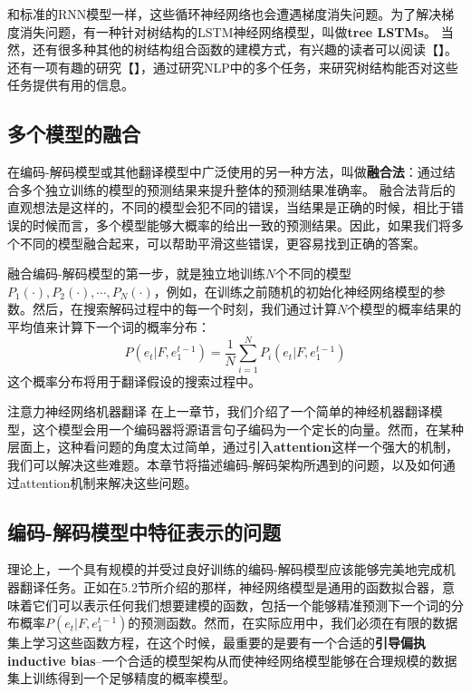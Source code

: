 \documentclass[10pt,a4paper]{ctexart}
\makeatletter
\renewcommand{\section}{\@startsection{section}{1}{0mm}
  {-\baselineskip}{0.5\baselineskip}{\bf\leftline}}
\makeatother
\begin{document}
和标准的RNN模型一样，这些循环神经网络也会遭遇梯度消失问题。为了解决梯度消失问题，有一种针对树结构的LSTM神经网络模型，叫做\textbf{tree LSTMs}。
当然，还有很多种其他的树结构组合函数的建模方式，有兴趣的读者可以阅读【】。
还有一项有趣的研究【】，通过研究NLP中的多个任务，来研究树结构能否对这些任务提供有用的信息。

\subsection{多个模型的融合}
在编码-解码模型或其他翻译模型中广泛使用的另一种方法，叫做\textbf{融合法}：通过结合多个独立训练的模型的预测结果来提升整体的预测结果准确率。
融合法背后的直观想法是这样的，不同的模型会犯不同的错误，当结果是正确的时候，相比于错误的时候而言，多个模型能够大概率的给出一致的预测结果。因此，如果我们将多个不同的模型融合起来，可以帮助平滑这些错误，更容易找到正确的答案。

融合编码-解码模型的第一步，就是独立地训练$N$个不同的模型$P_1(\cdot),P_2(\cdot),\cdots,P_N(\cdot)$，例如，在训练之前随机的初始化神经网络模型的参数。然后，在搜索解码过程中的每一个时刻，我们通过计算$N$个模型的概率结果的平均值来计算下一个词的概率分布：
\[
 P(e_t | F,e_1^{t-1}) = \frac{1}{N} \sum_{i=1}^{N} P_i(e_t | F,e_1^{t-1})
\]
这个概率分布将用于翻译假设的搜索过程中。


\section{注意力神经网络机器翻译}
在上一章节，我们介绍了一个简单的神经机器翻译模型，这个模型会用一个编码器将源语言句子编码为一个定长的向量。然而，在某种层面上，这种看问题的角度太过简单，通过引入\textbf{attention}这样一个强大的机制，我们可以解决这些难题。本章节将描述编码-解码架构所遇到的问题，以及如何通过attention机制来解决这些问题。

\subsection{编码-解码模型中特征表示的问题}
理论上，一个具有规模的并受过良好训练的编码-解码模型应该能够完美地完成机器翻译任务。正如在5.2节所介绍的那样，神经网络模型是通用的函数拟合器，意味着它们可以表示任何我们想要建模的函数，包括一个能够精准预测下一个词的分布概率$P(e_t | F,e_1^{t-1})$的预测函数。然而，在实际应用中，我们必须在有限的数据集上学习这些函数方程，在这个时候，最重要的是要有一个合适的\textbf{引导偏执inductive bias}--一个合适的模型架构从而使神经网络模型能够在合理规模的数据集上训练得到一个足够精度的概率模型。
\end{document}
